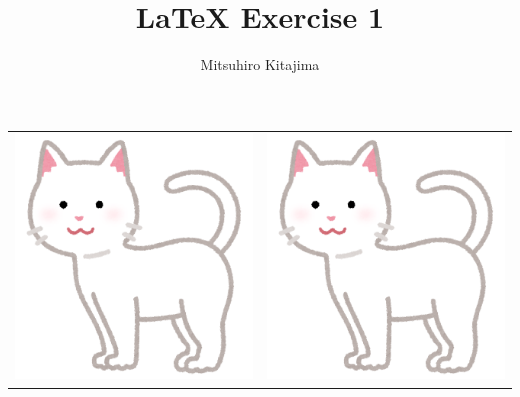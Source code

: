 \documentclass[11pt]{article}
\title{LaTeX Exercise 1}
\author{Mitsuhiro Kitajima}
\begin{document}
    \maketitle
    \begin{table}[htbp]
        \centering
        \label{tab:cat_images}
        \begin{tabular}{|c|c|}
            \hline
            \includegraphics[scale=0.1, angle=90]{cat02_moyou_white}  & \includegraphics[scale=0.2, angle=45]{cat02_moyou_white} \\

\end{tabular}
\end{table}
\end{document}
